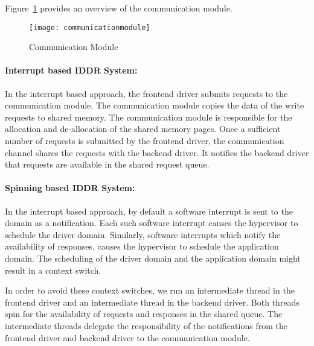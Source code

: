 Figure~\ref{fig:communication} provides an overview of the communication module. 
\begin{figure}[!ht]
\centering
\texttt{[image: communicationmodule]}
\caption{Communication Module}
\label{fig:communication}
\end{figure}

\paragraph{Interrupt based IDDR System:}
\label{par:base IDDR communication}
In the interrupt based approach, the frontend driver submits requests
to the communication module. The communication module copies the data of
the write requests to shared memory. The communication module is
responsible for the allocation and de-allocation of the shared memory
pages. Once a sufficient number of requests is submitted by the frontend
driver, the communication channel shares the requests with the backend
driver. It notifies the backend driver that requests are available in
the shared request queue.

\paragraph{Spinning based IDDR System:}
\label{par:spin IDDR communication} In the interrupt based approach, by
default a software interrupt is sent to the domain as a notification. Each
such software interrupt causes the hypervisor to schedule the driver
domain. Similarly, software interrupts which notify the availability of
responses, causes the hypervisor to schedule the application domain. The
scheduling of the driver domain and the application domain might result
in a context switch.

In order to avoid these context switches, we run an intermediate
thread in the frontend driver and an intermediate thread in the backend
driver. Both threads spin for the availability of requests and responses
in the shared queue. The intermediate threads delegate the responsibility
of the notifications from the frontend driver and backend driver to the
communication module.

